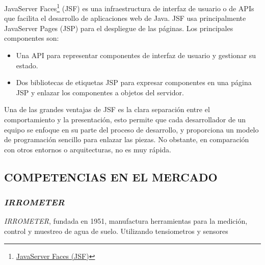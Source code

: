 
JavaServer Faces\footnote{\href{https://www.juntadeandalucia.es/servicios/madeja/contenido/recurso/101}{JavaServer Faces (JSF)}} (JSF) es una infraestructura de interfaz de usuario o de APIs que facilita el desarrollo de aplicaciones web de Java. JSF usa principalmente JavaServer Pages (JSP) para el despliegue de las páginas. Los principales componentes son:
\begin{itemize}
    \item Una API para representar componentes de interfaz de usuario y gestionar su estado.
    \item Dos bibliotecas de etiquetas JSP para expresar componentes en una página JSP y enlazar los componentes a objetos del servidor.
\end{itemize}
Una de las grandes ventajas de JSF es la clara separación entre el comportamiento y la presentación, esto permite que cada desarrollador de un equipo se enfoque en su parte del proceso de desarrollo, y proporciona un modelo de programación sencillo para enlazar las piezas. No obstante, en comparación con otros entornos o arquitecturas, no es muy rápida.

\subsection{COMPETENCIAS EN EL MERCADO}

\subsubsection{\textit{IRROMETER}}

\textit{IRROMETER}, fundada en 1951, manufactura herramientas para la medición, control y muestreo de agua de suelo. Utilizando tensiometros y sensores

